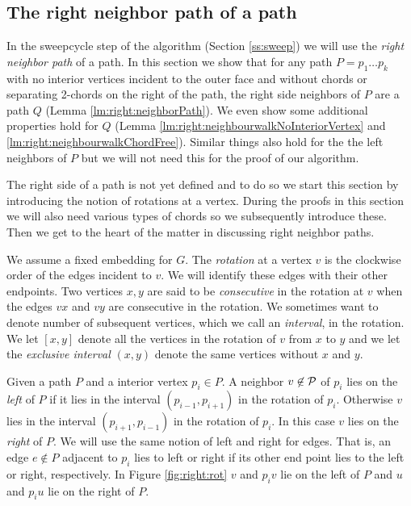 
\subsection{The right neighbor path of a path}
\thispagestyle{plain}
  \label{ss:rightNeighbour}
  In the sweepcycle step of the algorithm (Section \ref{ss:sweep}) we will use the \emph{right neighbor path} of a path. In this section we show that for any path $P = p_1 \ldots p_k$ with no interior vertices incident to the outer face and without chords or separating 2-chords on the right of the path, the right side neighbors of $P$ are a path $Q$ (Lemma \ref{lm:right:neighborPath}).
  We even show some additional properties hold for $Q$ (Lemma  \ref{lm:right:neighbourwalkNoInteriorVertex} and \ref{lm:right:neighbourwalkChordFree}).
  Similar things also hold for the the left neighbors of $P$ but we will not need this for the proof of our algorithm.

  The right side of a path is not yet defined and to do so we start this section by introducing the notion of rotations at a vertex. During the proofs in this section we will also need various types of chords so we subsequently introduce these. Then we get to the heart of the matter in discussing right neighbor paths.

    We assume a fixed embedding for $G$. The \emph{rotation} at a vertex $v$ is the clockwise order of the edges incident to $v$. We will identify these edges with their other endpoints.
    Two vertices $x, y$ are said to be \emph{consecutive} in the rotation at $v$ when the edges $vx$ and $vy$ are consecutive in the rotation.
    We sometimes want to denote number of subsequent vertices, which we call an \emph{interval}, in the rotation. We let $[x,y]$ denote all the vertices in the rotation of $v$ from $x$ to $y$ and we let the \emph{exclusive interval} $(x,y)$ denote the same vertices without $x$ and $y$.

    Given a path $P$ and a interior vertex $p_i \in P$. A neighbor $v \not \in \mathcal{P}$ of $p_i$ lies on the \emph{left} of $P$ if it lies in the interval $(p_{i-1}, p_{i+1})$ in the rotation of $p_{i}$. Otherwise $v$ lies in the interval $(p_{i+1}, p_{i-1})$ in the rotation of $p_i$. In this case $v$ lies on the \emph{right} of $P$.
    We will use the same notion of left and right for edges. That is, an edge $e\nin P$ adjacent to $p_i$ lies to left or right if its other end point lies to the left or right, respectively. In Figure \ref{fig:right:rot} $v$ and $p_i v$ lie on the left of $P$ and $u$ and $p_i u$ lie on the right of $P$.

